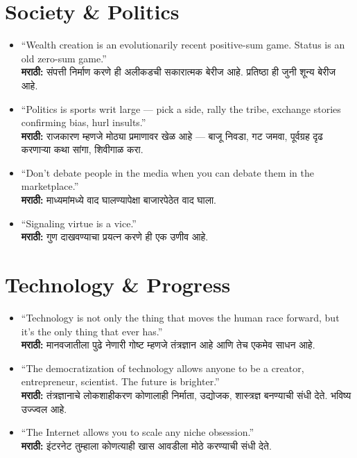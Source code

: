 \section*{Society \& Politics}
\begin{itemize}
    \item ``Wealth creation is an evolutionarily recent positive-sum game. Status is an old zero-sum game.'' \\
    \textbf{मराठी:} संपत्ती निर्माण करणे ही अलीकडची सकारात्मक बेरीज आहे. प्रतिष्ठा ही जुनी शून्य बेरीज आहे.

    \item ``Politics is sports writ large — pick a side, rally the tribe, exchange stories confirming bias, hurl insults.'' \\
    \textbf{मराठी:} राजकारण म्हणजे मोठ्या प्रमाणावर खेळ आहे — बाजू निवडा, गट जमवा, पूर्वग्रह दृढ करणाऱ्या कथा सांगा, शिवीगाळ करा.

    \item ``Don’t debate people in the media when you can debate them in the marketplace.'' \\
    \textbf{मराठी:} माध्यमांमध्ये वाद घालण्यापेक्षा बाजारपेठेत वाद घाला.

    \item ``Signaling virtue is a vice.'' \\
    \textbf{मराठी:} गुण दाखवण्याचा प्रयत्न करणे ही एक उणीव आहे.
\end{itemize}

\section*{Technology \& Progress}
\begin{itemize}
    \item ``Technology is not only the thing that moves the human race forward, but it’s the only thing that ever has.'' \\
    \textbf{मराठी:} मानवजातीला पुढे नेणारी गोष्ट म्हणजे तंत्रज्ञान आहे आणि तेच एकमेव साधन आहे.

    \item ``The democratization of technology allows anyone to be a creator, entrepreneur, scientist. The future is brighter.'' \\
    \textbf{मराठी:} तंत्रज्ञानाचे लोकशाहीकरण कोणालाही निर्माता, उद्योजक, शास्त्रज्ञ बनण्याची संधी देते. भविष्य उज्ज्वल आहे.

    \item ``The Internet allows you to scale any niche obsession.'' \\
    \textbf{मराठी:} इंटरनेट तुम्हाला कोणत्याही खास आवडीला मोठे करण्याची संधी देते.
\end{itemize}

